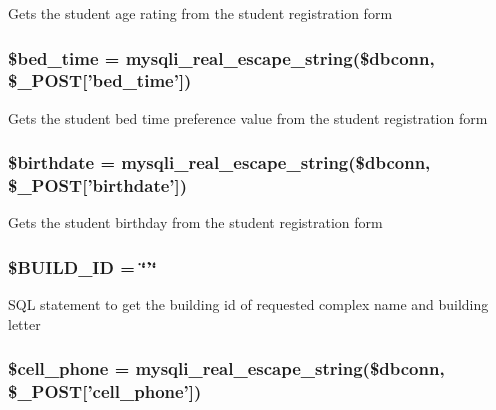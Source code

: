 \-Gets the student age rating from the student registration form \hypertarget{user__view_2validate_2studentVal_8php_a08edd61848021bc8ed4c15804842d5fb}{
\subsubsection[{\$bed\-\_\-time}]{\setlength{\rightskip}{0pt plus 5cm}\$bed\-\_\-time = mysqli\-\_\-real\-\_\-escape\-\_\-string(\$dbconn, \$\-\_\-\-P\-O\-S\-T\mbox{[}'bed\-\_\-time'\mbox{]})}}\label{user__view_2validate_2studentVal_8php_a08edd61848021bc8ed4c15804842d5fb}
\-Gets the student bed time preference value from the student registration form \hypertarget{user__view_2validate_2studentVal_8php_a1d5a040d6cd65b40daa47911e18adbb0}{
\subsubsection[{\$birthdate}]{\setlength{\rightskip}{0pt plus 5cm}\$birthdate = mysqli\-\_\-real\-\_\-escape\-\_\-string(\$dbconn, \$\-\_\-\-P\-O\-S\-T\mbox{[}'birthdate'\mbox{]})}}\label{user__view_2validate_2studentVal_8php_a1d5a040d6cd65b40daa47911e18adbb0}
\-Gets the student birthday from the student registration form \hypertarget{user__view_2validate_2studentVal_8php_a4003cf8da4c94911cef7e69853cbac42}{
\subsubsection[{\$\-B\-U\-I\-L\-D\-\_\-\-I\-D}]{\setlength{\rightskip}{0pt plus 5cm}\$\-B\-U\-I\-L\-D\-\_\-\-I\-D = \char`\"{}'\char`\"{}}}\label{user__view_2validate_2studentVal_8php_a4003cf8da4c94911cef7e69853cbac42}
\-S\-Q\-L statement to get the building id of requested complex name and building letter \hypertarget{user__view_2validate_2studentVal_8php_a04f4e771f2239bf8a55f2ee7580a9609}{
\subsubsection[{\$cell\-\_\-phone}]{\setlength{\rightskip}{0pt plus 5cm}\$cell\-\_\-phone = mysqli\-\_\-real\-\_\-escape\-\_\-string(\$dbconn, \$\-\_\-\-P\-O\-S\-T\mbox{[}'cell\-\_\-phone'\mbox{]})}}\label{user__view_2validate_2studentVal_8php_a04f4e771f2239bf8a55f2ee7580a9609}
